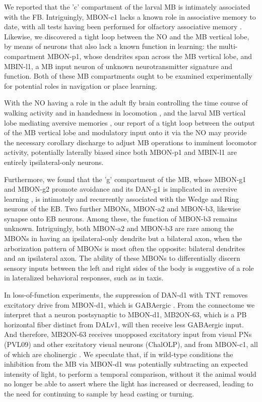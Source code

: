 We reported that the 'c' compartment of the larval MB is intimately associated with the FB. Intriguingly, MBON-c1 lacks a known role in associative memory to date, with all tests having been performed for olfactory associative memory \citep{eschbach2020recurrent}. Likewise, we discovered a tight loop between the NO and the MB vertical lobe, by means of neurons that also lack a known function in learning: the multi-compartment MBON-p1, whose dendrites span across the MB vertical lobe, and MBIN-l1, a MB input neuron of unknown neurotransmitter signature and function. Both of these MB compartments ought to be examined experimentally for potential roles in navigation or place learning.

With the NO having a role in the adult fly brain controlling the time course of walking activity \citep{strauss1993higher} and in handedness in locomotion \citep{buchanan2015neuronal}, and the larval MB vertical lobe mediating aversive memories \citep{eschbach2020recurrent}, our report of a tight loop between the output of the MB vertical lobe and modulatory input onto it via the NO may provide the necessary corollary discharge to adjust MB operations to imminent locomotor activity, potentially laterally biased since both MBON-p1 and MBIN-l1 are entirely ipsilateral-only neurons.

Furthermore, we found that the 'g' compartment of the MB, whose MBON-g1 and MBON-g2 promote avoidance \citep{eschbach2021circuits} and its DAN-g1 is implicated in aversive learning \citep{eschbach2020recurrent}, is intimately and recurrently associated with the Wedge and Ring neurons of the EB. Two further MBONs, MBON-a2 and MBON-b3, likewise synapse onto EB neurons. Among these, the function of MBON-b3 remains unknown. Intriguingly, both MBON-a2 and MBON-b3 are rare among the MBONs in having an ipsilateral-only dendrite but a bilateral axon, when the arborization pattern of MBONs is most often the opposite: bilateral dendrites and an ipsilateral axon. The ability of these MBONs to differentially discern sensory inputs between the left and right sides of the body is suggestive of a role in lateralized behavioral responses, such as in taxis.

In loss-of-function experiments, the suppression of DAN-d1 with TNT removes excitatory drive from MBON-d1, which is GABAergic \citep{eschbach2021circuits}. From the connectome we interpret that a neuron postsynaptic to MBON-d1, MB2ON-63, which is a PB horizontal fiber distinct from DALv1, will then receive less GABAergic input. And therefore, MB2ON-63 receives unopposed excitatory input from visual PNs (PVL09) and other excitatory visual neurons (ChalOLP), and from MBON-c1, all of which are cholinergic \citep{larderet2017opticlobe, eschbach2021circuits}. We speculate that, if in wild-type conditions the inhibition from the MB via MBON-d1 was potentially subtracting an expected intensity of light, to perform a temporal comparison, without it the animal would no longer be able to assert where the light has increased or decreased, leading to the need for continuing to sample by head casting or turning.


